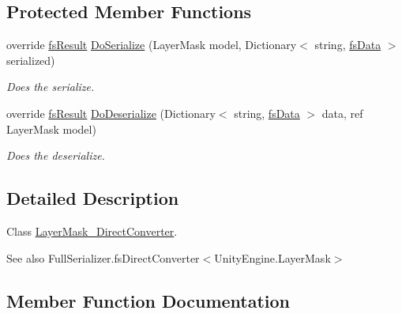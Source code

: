 \subsection*{Protected Member Functions}
\begin{DoxyCompactItemize}
\item 
override \hyperlink{struct_full_serializer_1_1fs_result}{fs\+Result} \hyperlink{class_full_serializer_1_1_internal_1_1_direct_converters_1_1_layer_mask___direct_converter_ac05514b589b5f07dc821d17e23f09a80}{Do\+Serialize} (Layer\+Mask model, Dictionary$<$ string, \hyperlink{class_full_serializer_1_1fs_data}{fs\+Data} $>$ serialized)
\begin{DoxyCompactList}\small\item\em Does the serialize. \end{DoxyCompactList}\item 
override \hyperlink{struct_full_serializer_1_1fs_result}{fs\+Result} \hyperlink{class_full_serializer_1_1_internal_1_1_direct_converters_1_1_layer_mask___direct_converter_a5250547a17e4fdf730f9db241b3d36d0}{Do\+Deserialize} (Dictionary$<$ string, \hyperlink{class_full_serializer_1_1fs_data}{fs\+Data} $>$ data, ref Layer\+Mask model)
\begin{DoxyCompactList}\small\item\em Does the deserialize. \end{DoxyCompactList}\end{DoxyCompactItemize}


\subsection{Detailed Description}
Class \hyperlink{class_full_serializer_1_1_internal_1_1_direct_converters_1_1_layer_mask___direct_converter}{Layer\+Mask\+\_\+\+Direct\+Converter}. 

\begin{DoxySeeAlso}{See also}
Full\+Serializer.\+fs\+Direct\+Converter$<$\+Unity\+Engine.\+Layer\+Mask$>$


\end{DoxySeeAlso}


\subsection{Member Function Documentation}
\mbox{\label{class_full_serializer_1_1_internal_1_1_direct_converters_1_1_layer_mask___direct_converter_a137b60e8c056f96e17449e04ad563f67}} 
